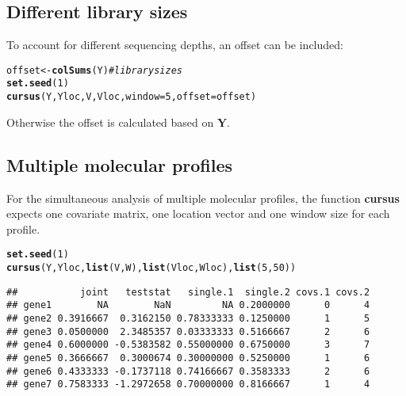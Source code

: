 \documentclass{article}\usepackage[]{graphicx}\usepackage[]{color}
\makeatletter
\newcommand{\hlnum}[1]{\textcolor[rgb]{0.686,0.059,0.569}{#1}}%
\newcommand{\hlcom}[1]{\textcolor[rgb]{0.678,0.584,0.686}{\textit{#1}}}%
\newcommand{\hlstd}[1]{\textcolor[rgb]{0.345,0.345,0.345}{#1}}%
\newcommand{\hlkwb}[1]{\textcolor[rgb]{0.69,0.353,0.396}{#1}}%
\newcommand{\hlkwc}[1]{\textcolor[rgb]{0.333,0.667,0.333}{#1}}%
\newcommand{\hlkwd}[1]{\textcolor[rgb]{0.737,0.353,0.396}{\textbf{#1}}}%
\newenvironment{kframe}{%
 \def\at@end@of@kframe{}%
 \ifinner\ifhmode%
  \def\at@end@of@kframe{\end{minipage}}%
  \begin{minipage}{\columnwidth}%
 \fi\fi%
 \def\FrameCommand##1{\hskip\@totalleftmargin \hskip-\fboxsep
 \colorbox{shadecolor}{##1}\hskip-\fboxsep
     \hskip-\linewidth \hskip-\@totalleftmargin \hskip\columnwidth}%
 \MakeFramed {\advance\hsize-\width
   \@totalleftmargin\z@ \linewidth\hsize
   \@setminipage}}%
 {\par\unskip\endMakeFramed%
 \at@end@of@kframe}
\newenvironment{knitrout}{}{} %
\makeatother
\begin{document}
\subsection{Different library sizes}
\label{cursus_different_library_sizes}

To account for different sequencing depths, an offset can be included:
\begin{knitrout}
\color{fgcolor}\begin{kframe}
\begin{alltt}
\hlstd{offset} \hlkwb{<-} \hlkwd{colSums}\hlstd{(Y)} \hlcom{# library sizes}
\hlkwd{set.seed}\hlstd{(}\hlnum{1}\hlstd{)}
\hlkwd{cursus}\hlstd{(Y,Yloc,V,Vloc,}\hlkwc{window}\hlstd{=}\hlnum{5}\hlstd{,}\hlkwc{offset}\hlstd{=offset)}
\end{alltt}
\end{kframe}
\end{knitrout}
Otherwise the offset is calculated based on $\boldsymbol{Y}$.

\newpage

\subsection{Multiple molecular profiles}
\label{cursus_multiple_molecular_profiles}

For the simultaneous analysis of multiple molecular profiles, the function \textbf{cursus} expects one covariate matrix, one location vector and one window size for each profile.

\begin{knitrout}
\color{fgcolor}\begin{kframe}
\begin{alltt}
\hlkwd{set.seed}\hlstd{(}\hlnum{1}\hlstd{)}
\hlkwd{cursus}\hlstd{(Y,Yloc,}\hlkwd{list}\hlstd{(V,W),}\hlkwd{list}\hlstd{(Vloc,Wloc),}\hlkwd{list}\hlstd{(}\hlnum{5}\hlstd{,}\hlnum{50}\hlstd{))}
\end{alltt}
\begin{verbatim}
##           joint   teststat   single.1  single.2 covs.1 covs.2
## gene1        NA        NaN         NA 0.2000000      0      4
## gene2 0.3916667  0.3162150 0.78333333 0.1250000      1      5
## gene3 0.0500000  2.3485357 0.03333333 0.5166667      2      6
## gene4 0.6000000 -0.5383582 0.55000000 0.6750000      3      7
## gene5 0.3666667  0.3000674 0.30000000 0.5250000      1      6
## gene6 0.4333333 -0.1737118 0.74166667 0.3583333      2      6
## gene7 0.7583333 -1.2972658 0.70000000 0.8166667      1      4
\end{verbatim}
\end{kframe}
\end{knitrout}
\end{document}
